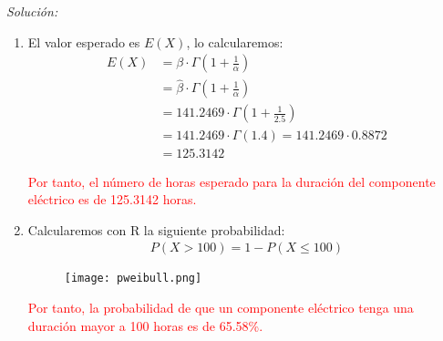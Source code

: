 \documentclass[12pt]{article}
\newenvironment{sol}
    {\emph{Solución:}
    }
    {
    }
\begin{document}
\begin{sol}
\begin{enumerate}[label=\alph*)]
\pagebreak

\item El valor esperado es $E(X)$, lo calcularemos:
\begin{align*}
E(X) &= \beta \cdot \Gamma(1+\frac{1}{\alpha})\\
 &= \hat{\beta} \cdot \Gamma (1+\frac{1}{\alpha})\\
 &= 141.2469 \cdot \Gamma(1+\frac{1}{2.5}) \\
 &= 141.2469 \cdot \Gamma(1.4) = 141.2469 \cdot 0.8872 \\
 &= 125.3142
\end{align*} 

\textcolor{red}{%
    Por tanto, el número de horas esperado para la duración del componente eléctrico es de 125.3142 horas.  
}

\item Calcularemos con R la siguiente probabilidad:
\begin{align*}
	P(X>100) = 1-P(X\leq 100)
\end{align*}

\begin{figure}[h]  %
    \centering      %
    \texttt{[image: pweibull.png]} 
\end{figure}
\textcolor{red}{%
    Por tanto, la probabilidad de que un componente eléctrico tenga una duración mayor a 100 horas es de 65.58\%.
}
\end{enumerate}
\end{sol}

\pagebreak
\end{document}
